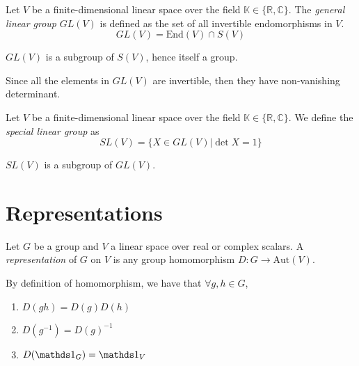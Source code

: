 \begin{definition}[$GL(V)$]
    Let $V$ be a finite-dimensional linear space over the field $\mathbb{K} \in \{\mathbb{R}, \mathbb{C}\}$. The \emph{general linear group} $GL(V)$ is defined as the set of all invertible endomorphisms in $V$.
    \begin{equation*}
        GL(V) = \text{End}(V) \cap S(V)
    \end{equation*}
\end{definition}
\begin{proposition}
    $GL(V)$ is a subgroup of $S(V)$, hence itself a group.
\end{proposition}

\begin{remark}
    Since all the elements in $GL(V)$ are invertible, then they have non-vanishing determinant.
\end{remark}


\begin{definition}[$SL(V)$]
    Let $V$ be a finite-dimensional linear space over the field $\mathbb{K} \in \{\mathbb{R}, \mathbb{C}\}$. We define the \emph{special linear group} as
    \begin{equation*}
        SL(V) = \{X \in GL(V) | \det X = 1\}
    \end{equation*}
\end{definition}
\begin{proposition}
    $SL(V)$ is a subgroup of $GL(V)$.
\end{proposition}





\section{Representations}


\begin{definition}[Representation]
    Let $G$ be a group and $V$ a linear space over real or complex scalars. A \emph{representation} of $G$ on $V$ is any group homomorphism $D: G \rightarrow \text{Aut}(V)$.
\end{definition}
\begin{remark}
    By definition of homomorphism, we have that $\forall g, h \in G$,
    \begin{enumerate}
        \item $D(gh) = D(g) D(h)$
        \item $D(g^{-1}) = D(g)^{-1}$
        \item $D(\idop_G) = \idop_V$
    \end{enumerate}
\end{remark}


